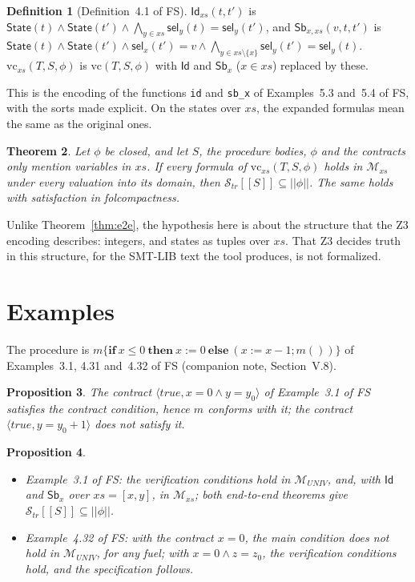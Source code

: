 \documentclass[11pt]{article}
\newcommand{\sem}[1]{[\![ #1 ]\!]}
\newcommand{\fsem}[1]{|\!|#1|\!|}
\newcommand{\Str}{{\mathcal{S}_{\mathit{tr}}}}
\newcommand{\Id}{\mathsf{Id}}
\newcommand{\Sb}[2]{\mathsf{Sb}^{#1}_{#2}}
\newcommand{\kw}[1]{\mathbf{#1}}
\newcommand{\ite}[3]{\kw{if}\ #1\ \kw{then}\ #2\ \kw{else}\ #3}
\newcommand{\call}[1]{#1()}
\newcommand{\vc}{\mathrm{vc}}
\newcommand{\M}{\mathcal{M}}
\newcommand{\tsel}[1]{\mathsf{sel}_{#1}}
\newcommand{\Th}[1]{#1 of FS}
\theoremstyle{plain}
\newtheorem{theorem}{Theorem}[section]
\newtheorem{proposition}[theorem]{Proposition}
\theoremstyle{definition}
\newtheorem{definition}[theorem]{Definition}
\theoremstyle{remark}
\begin{document}
\begin{definition}[\Th{Definition~4.1}]\label{def:expand}
  $\Id_{xs}(t, t')$ is $\mathsf{State}(t) \land \mathsf{State}(t') \land
  \bigwedge_{y \in xs} \tsel{y}(t) = \tsel{y}(t')$, and
  $\Sb{}{x,xs}(v, t, t')$ is $\mathsf{State}(t) \land \mathsf{State}(t')
  \land \tsel{x}(t') = v \land \bigwedge_{y \in xs \setminus \{x\}}
  \tsel{y}(t') = \tsel{y}(t)$. $\vc_{xs}(T, S, \phi)$ is $\vc(T, S,
  \phi)$ with $\Id$ and $\Sb{}{x}$ ($x \in xs$) replaced by these.
\end{definition}

This is the encoding of the functions \texttt{id} and \texttt{sb\_x} of
\Th{Examples~5.3 and~5.4}, with the sorts made explicit. On the states over
$xs$, the expanded formulas mean the same as the original ones.

\begin{theorem}\label{thm:e2e-xs}
  Let $\phi$ be closed, and let $S$, the procedure bodies, $\phi$ and the
  contracts only mention variables in $xs$. If every formula of
  $\vc_{xs}(T, S, \phi)$ holds in $\M_{xs}$ under every valuation into
  its domain, then $\Str\sem{S} \subseteq \fsem{\phi}$. The same holds
  with satisfaction in folcompactness.
\end{theorem}

Unlike Theorem~\ref{thm:e2e}, the hypothesis here is about the structure
that the Z3 encoding describes: integers, and states as tuples over $xs$.
That Z3 decides truth in this structure, for the SMT-LIB text the tool
produces, is not formalized.

\section{Examples}\label{sec:examples}

The procedure is $m\{\ite{x \le 0}{x := 0}{(x := x - 1; \call{m})}\}$ of
\Th{Examples~3.1, 4.31 and~4.32} (companion note, Section~V.8).

\begin{proposition}\label{prop:ex-pcc}
  The contract $\langle \mathit{true}, x = 0 \land y = y_0\rangle$ of
  \Th{Example~3.1} satisfies the contract condition, hence $m$ conforms
  with it; the contract $\langle\mathit{true}, y = y_0 + 1\rangle$ does
  not satisfy it.
\end{proposition}

\begin{proposition}\label{prop:ex-e2e}
  \leavevmode
  \begin{itemize}
  \item \Th{Example~3.1}: the verification conditions hold in
    $\M_{\mathit{UNIV}}$, and, with $\Id$ and $\Sb{}{x}$ over $xs = [x,
    y]$, in $\M_{xs}$; both end-to-end theorems give $\Str\sem{S}
    \subseteq \fsem{\phi}$.
  \item \Th{Example~4.32}: with the contract $x = 0$, the main condition
    does not hold in $\M_{\mathit{UNIV}}$, for any fuel; with $x = 0
    \land z = z_0$, the verification conditions hold, and the
    specification follows.
  \end{itemize}
\end{proposition}
\end{document}
